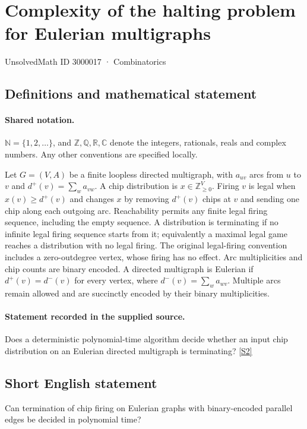 \documentclass[11pt]{article}
\newcommand{\sref}[2]{\hyperlink{source:#1:#2}{[S#2]}}
\begin{document}
\setcounter{section}{3000016}
\section{Complexity of the halting problem for Eulerian multigraphs}\label{3000017}
{\small\sffamily UnsolvedMath ID 3000017 · Combinatorics}
\subsection{Definitions and mathematical statement}

\paragraph{Shared notation.}$\mathbb N=\{1,2,\ldots\}$, and $\mathbb Z,\mathbb Q,\mathbb R,\mathbb C$ denote the integers, rationals, reals and complex numbers. Any other conventions are specified locally.


Let $G=(V,A)$ be a finite loopless directed multigraph, with $a_{uv}$ arcs from $u$ to $v$ and $d^+(v)=\sum_w a_{vw}$. A chip distribution is $x\in\mathbb Z_{\ge0}^{V}$. Firing $v$ is legal when $x(v)\ge d^+(v)$ and changes $x$ by removing $d^+(v)$ chips at $v$ and sending one chip along each outgoing arc. Reachability permits any finite legal firing sequence, including the empty sequence. A distribution is terminating if no infinite legal firing sequence starts from it; equivalently a maximal legal game reaches a distribution with no legal firing. The original legal-firing convention includes a zero-outdegree vertex, whose firing has no effect. Arc multiplicities and chip counts are binary encoded. A directed multigraph is Eulerian if $d^+(v)=d^-(v)$ for every vertex, where $d^-(v)=\sum_w a_{wv}$. Multiple arcs remain allowed and are succinctly encoded by their binary multiplicities.
\paragraph{Statement recorded in the supplied source.}
Does a deterministic polynomial-time algorithm decide whether an input chip distribution on an Eulerian directed multigraph is terminating? \sref{3000017}{2}
\subsection{Short English statement}
Can termination of chip firing on Eulerian graphs with binary-encoded parallel edges be decided in polynomial time?
\end{document}
